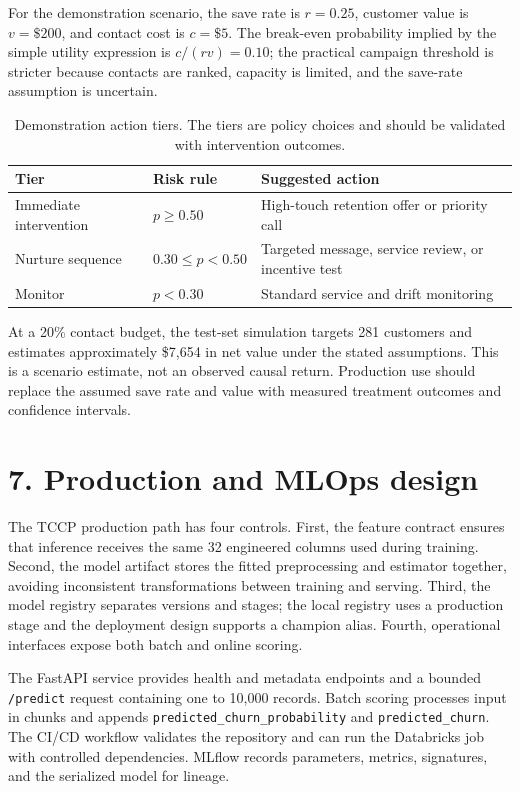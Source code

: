 \documentclass[9pt]{article}
\begin{document}
For the demonstration scenario, the save rate is $r=0.25$, customer value is $v=\$200$, and contact cost is $c=\$5$. The break-even probability implied by the simple utility expression is $c/(rv)=0.10$; the practical campaign threshold is stricter because contacts are ranked, capacity is limited, and the save-rate assumption is uncertain.

\begin{table}[!ht]
\centering\small
\begin{tabular}{lll}
\toprule
\textbf{Tier} & \textbf{Risk rule} & \textbf{Suggested action}\\
\midrule
Immediate intervention & $p\geq0.50$ & High-touch retention offer or priority call\\
Nurture sequence & $0.30\leq p<0.50$ & Targeted message, service review, or incentive test\\
Monitor & $p<0.30$ & Standard service and drift monitoring\\
\bottomrule
\end{tabular}
\caption{Demonstration action tiers. The tiers are policy choices and should be validated with intervention outcomes.}
\label{tab:tiers}
\end{table}

At a 20\% contact budget, the test-set simulation targets 281 customers and estimates approximately \$7,654 in net value under the stated assumptions. This is a scenario estimate, not an observed causal return. Production use should replace the assumed save rate and value with measured treatment outcomes and confidence intervals.

\section*{7. Production and MLOps design}
The TCCP production path has four controls. First, the feature contract ensures that inference receives the same 32 engineered columns used during training. Second, the model artifact stores the fitted preprocessing and estimator together, avoiding inconsistent transformations between training and serving. Third, the model registry separates versions and stages; the local registry uses a production stage and the deployment design supports a champion alias. Fourth, operational interfaces expose both batch and online scoring.

The FastAPI service provides health and metadata endpoints and a bounded \texttt{/predict} request containing one to 10,000 records. Batch scoring processes input in chunks and appends \texttt{predicted\_churn\_probability} and \texttt{predicted\_churn}. The CI/CD workflow validates the repository and can run the Databricks job with controlled dependencies. MLflow records parameters, metrics, signatures, and the serialized model for lineage.
\end{document}
